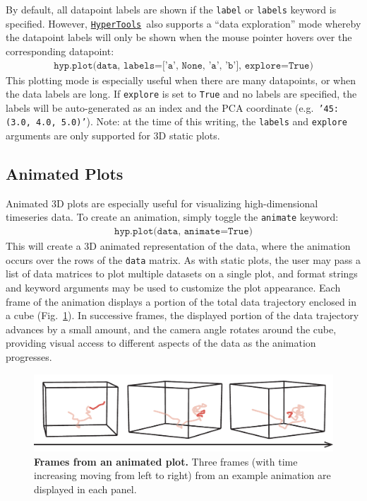 \documentclass[12pt,letterpaper]{article}
\newcommand{\hypertools}{\href{https://github.com/ContextLab/hypertools}{\texttt{HyperTools}}}
\newcounter{example}
\begin{document}
By default, all datapoint labels are shown if the \texttt{label} or \texttt{labels} keyword is specified.  However, \hypertools~also supports a ``data exploration'' mode whereby the datapoint labels will only be shown when the mouse pointer hovers over the corresponding datapoint:
\begin{align}
\texttt{hyp.plot(data, labels=['a', None, 'a', 'b'], explore=True)}
\end{align}
This plotting mode is especially useful when there are many datapoints, or when the data labels are long.  If \texttt{explore} is set to \texttt{True} and no labels are specified, the labels will be auto-generated as an index and the PCA coordinate (e.g.\ \texttt{'45: (3.0, 4.0, 5.0)'}). Note: at the time of this writing, the \texttt{labels} and \texttt{explore} arguments are only supported for 3D static plots.



\subsection*{Animated Plots}
Animated 3D plots are especially useful for visualizing high-dimensional timeseries data.  To create an animation, simply toggle the \texttt{animate} keyword:
\begin{align}
\texttt{hyp.plot(data, animate=True)}
\end{align}
This will create a 3D animated representation of the data, where the animation occurs over the rows of the \texttt{data} matrix.  As with static plots, the user may pass a list of data matrices to plot multiple datasets on a single plot, and format strings and keyword arguments may be used to customize the plot appearance.  Each frame of the animation displays a portion of the total data trajectory enclosed in a cube (Fig.~\ref{fig:animation}).  In successive frames, the displayed portion of the data trajectory advances by a small amount, and the camera angle rotates around the cube, providing visual access to different aspects of the data as the animation progresses.

\begin{figure}[tbp]
\centering
\includegraphics[width=\textwidth]{animation}
\caption{\textbf{Frames from an animated plot.}  Three frames (with time increasing moving from left to right) from an example animation are displayed in each panel.}
\label{fig:animation}
\end{figure}
\end{document}
